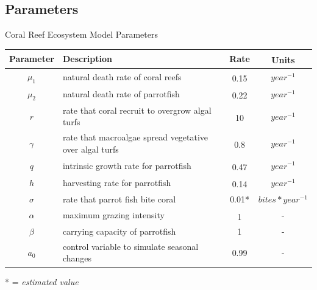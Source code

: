 \documentclass{beamer}
\begin{document}
\subsection{Parameters}
\begin{frame}{Coral Reef Ecosystem Model Parameters}
    \begin{table}
    \vspace{-.7cm}
    \begin{tabular}{c p{5cm} c c}
        \hline
        Parameter & Description & Rate & Units\textsuperscript{\cite{12_noaa_report}\cite{04_mathanalysis}\cite{13_blackwood_hastings_mumby_2010}}\\
        \hline
        \hline
        $\mu_{1}$ & natural death rate of coral reefs & 0.15\textsuperscript{\cite{16_wolanski_richmond_mccook_2004}} & $year^{-1}$\\ %
        $\mu_{2}$ & natural death rate of parrotfish & 0.22\textsuperscript{\cite{12_noaa_report}} & $year^{-1}$\\ %
        $r$ & rate that coral recruit to overgrow algal turfs & 10\textsuperscript{\cite{16_wolanski_richmond_mccook_2004}} & $year^{-1}$\\ %
        $\gamma$ & rate that macroalgae spread vegetative over algal turfs & 0.8\textsuperscript{\cite{11_zikkah_anggriani_supriatna_2020}} & $year^{-1}$\\ %
        $q$ & intrinsic growth rate for parrotfish & 0.47\textsuperscript{\cite{12_noaa_report}} & $year^{-1}$\\ %
        $h$ & harvesting rate for parrotfish & 0.14\textsuperscript{\cite{12_noaa_report}} & $year^{-1}$\\ %
        $\sigma$ & rate that parrot fish bite coral & 0.01*& $bites*year^{-1}$\\
        $\alpha$ & maximum grazing intensity & 1\textsuperscript{\cite{13_blackwood_hastings_mumby_2010}} & -\\
        $\beta$ & carrying capacity of parrotfish & 1 & -\\
        $a_{0}$ & control variable to simulate seasonal changes & 0.99 & - %
    \end{tabular}
\end{table}
* = \textit{estimated value}
\end{frame}
\end{document}
